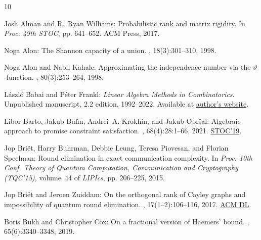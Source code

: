 \documentclass[11pt]{article}
\numberwithin{equation}{section}
\theoremstyle{definition}
\theoremstyle{plain}
\begin{document}
\tocrefpdfbookmark
\begin{thebibliography}{10}

{\sc Josh Alman and R.~Ryan Williams}: Probabilistic rank and matrix rigidity.
\newblock In {\em Proc. 49th STOC}, pp. 641--652. ACM Press, 2017.
\newblock [\epfmtdoi{10.1145/3055399.3055484}]

{\sc Noga Alon}: The {S}hannon capacity of a union.
, 18(3):301--310, 1998.
\newblock [\epfmtdoi{10.1007/PL00009824}]

{\sc Noga Alon and Nabil Kahale}: Approximating the independence number via the
  $\vartheta$-function.
, 80(3):253--264, 1998.
\newblock [\epfmtdoi{10.1007/BF01581168}]

{\sc L{\'{a}}szl{\'{o}} Babai and P{\'{e}}ter Frankl}: {\em Linear Algebra
  Methods in Combinatorics}.
\newblock Unpublished manuscript, 2.2 edition, 1992--2022.
\newblock Available at
  \href{https://people.cs.uchicago.edu/~laci/babai-frankl-book2022.pdf}{author's
  website}.

{\sc Libor Barto, Jakub Bul{\'{\i}}n, Andrei~A. Krokhin, and Jakub Opr{\v
  s}al}: Algebraic approach to promise constraint satisfaction.
, 68(4):28:1--66, 2021.
\newblock \prelim \href{https:doi.org/10.1145/3313276.3316300}{STOC'19}.
\newblock [\epfmtdoi{10.1145/3457606}]

{\sc Jop Bri{\"{e}}t, Harry Buhrman, Debbie Leung, Teresa Piovesan, and Florian
  Speelman}: Round elimination in exact communication complexity.
\newblock In {\em Proc. 10th Conf. Theory of Quantum Computation, Communication
  and Cryptography {(TQC'15)}}, volume~44 of {\em LIPIcs}, pp. 206--225, 2015.

{\sc Jop Bri{\"{e}}t and Jeroen Zuiddam}: On the orthogonal rank of {C}ayley
  graphs and impossibility of quantum round elimination.
, 17(1--2):106--116, 2017.
\newblock \href{https://dl.acm.org/doi/abs/10.5555/3179483.3179489}{ACM DL}.

{\sc Boris Bukh and Christopher Cox}: On a fractional version of {H}aemers'
  bound.
, 65(6):3340--3348, 2019.


\end{thebibliography}
\end{document}
